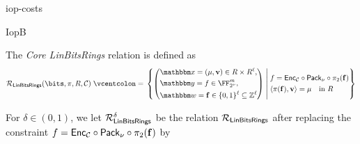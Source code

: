 \begin{lncsappendix}{iop-costs}
\begin{lncsmove}{IopB}
\begin{definition}\label{d:core_linbitsrings} The \emph{Core LinBitsRings} relation  is defined as
%
\iflncs\begingroup\small\fi
$$
\LinBitsDual(\bits,\pi, R,\cC) \defeq \left\{ \left(\begin{aligned} &\inp=(\mu, \vv)\in R \times R^{\codedim}, \\&\oracle = f \in \comfield^\codelength, \\ &\wit= \bff\in \{0,1\}^\codedim \subseteq \ZZ^\codedim\end{aligned}\right) \;\middle|\;  \begin{aligned} &f=\Enc_{\cC}\circ \pack \circ \picomfield(\bff) \\    & \langle \pi(\bff), \vv\rangle  = \mu \quad \text{in } R  \end{aligned} \right\}
$$
\iflncs\endgroup\fi
%
\end{definition}
%
%
%
%
\iflncs\else For $\delta\in (0,1)$, we let $\mathcal{R}_{\mathsf{LinBitsRings}}^\delta$  be the relation $\mathcal{R}_{\mathsf{LinBitsRings}}$  after replacing the constraint $f=\mathsf{Enc}_{\mathcal{C}}\circ \mathsf{Pack}_\nu\circ\pi_2(\mathbf{f})$ by
%
\fi
%
%
%
%
%

\renewcommand{\moduleone}{M}
\renewcommand{\moduleonebound}{M_{\leq B}}
\renewcommand{\moduletwo}{R}





%
%





\end{lncsmove}
\end{lncsappendix}
